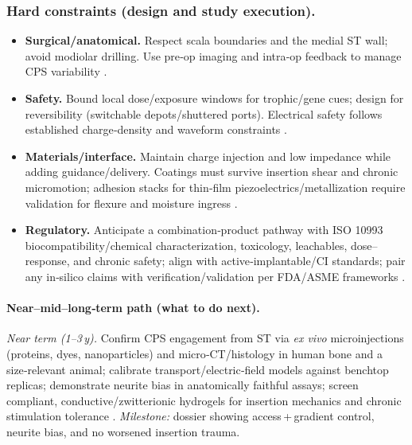 \documentclass[referee,pdflatex, sn-vancouver-num]{sn-jnl}%
\theoremstyle{thmstyleone}%
\theoremstyle{thmstyletwo}%
\theoremstyle{thmstylethree}%
\begin{document}
\subsubsection{Hard constraints (design and study execution).}
\begin{itemize}
  \item \textbf{Surgical/anatomical.} Respect scala boundaries and the medial ST wall; avoid modiolar drilling. Use pre‑op imaging and intra‑op feedback to manage CPS variability \cite{Rebscher2008,Sheykholeslami2002}.
  \item \textbf{Safety.} Bound local dose/exposure windows for trophic/gene cues; design for reversibility (switchable depots/shuttered ports). Electrical safety follows established charge‑density and waveform constraints \cite{Kempfle2021,StPeter2022,Scheper2019,Merrill2005_Waveforms,Cogan2008_NeuralElectrodes}.
  \item \textbf{Materials/interface.} Maintain charge injection and low impedance while adding guidance/delivery. Coatings must survive insertion shear and chronic micromotion; adhesion stacks for thin‑film piezoelectrics/metallization require validation for flexure and moisture ingress \cite{Dalrymple2020,Horne2023,Green2012,Goding2017,TrolierMcKinstry2004_PiezoMEMS,Dagdeviren2014_ConformalPiezo}.
  \item \textbf{Regulatory.} Anticipate a combination‑product pathway with ISO 10993 biocompatibility/chemical characterization, toxicology, leachables, dose–response, and chronic safety; align with active‑implantable/CI standards; pair any in‑silico claims with verification/validation per FDA/ASME frameworks \cite{ISO10993-1_2018_Biocompatibility,ISO14708-7:2016_CI,USFDA2021InSilico,ASMEVV40_2018}.
\end{itemize}

\paragraph{Near–mid–long‑term path (what to do next).}
\textit{Near term (1–3\,y).} Confirm CPS{} engagement from ST via \emph{ex vivo} microinjections (proteins, dyes, nanoparticles) and micro‑CT/histology in human bone and a size‑relevant animal; calibrate transport/electric‑field models against benchtop replicas; demonstrate neurite bias in anatomically faithful assays; screen compliant, conductive/zwitterionic hydrogels for insertion mechanics and chronic stimulation tolerance \cite{raskandersen2006,lim1970,Micco2006,Nella2022NeurotrophinGradients,Leake2013,Dalrymple2020,Horne2023,Rebscher2008}. \textit{Milestone:} dossier showing access\,+\,gradient control, neurite bias, and no worsened insertion trauma.
\end{document}
